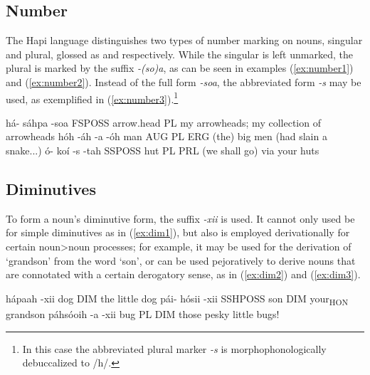 \documentclass[a4paper, 12pt, oneside]{memoir}
\newcommand{\emh}[1]{\textit{#1}}
\begin{document}
\subsection{Number}\label{snumber}
The Hapi language distinguishes two types of number marking on nouns, singular and plural, glossed as {\Sg} and {\Pl} respectively. While the singular is left unmarked, the plural is marked by the suffix \emh{-(so)a}, as can be seen in examples (\ref{ex:number1}) and (\ref{ex:number2}). Instead of the full form \emh{-soa}, the abbreviated form \emh{-s} may be used, as exemplified in (\ref{ex:number3}).\footnote{In this case the abbreviated plural marker \emh{-s} is morphophonologically debuccalized to /h/.}
\begin{examples}
\ex
\label{ex:number1}
\bits há- sáhpa -soa
\gloss FSPOSS arrow.head PL
\tr my arrowheads; my collection of arrowheads
\ex
\label{ex:number2}
\bits hóh -áh -a -óh
\gloss man AUG PL ERG
\tr (the) big men (had slain a snake...)
\ex 
\label{ex:number3}
\bits ó- koí -s -tah
\gloss SSPOSS hut PL PRL
\tr (we shall go) via your huts
\end{examples}
\subsection{Diminutives}\label{sdim}
To form a noun's diminutive form, the suffix \emh{-xii} is used. It cannot only used be for simple diminutives as in (\ref{ex:dim1}), but also is employed derivationally for certain noun>noun processes; for example, it may be used for the derivation of `grandson' from the word `son', or can be used pejoratively to derive nouns that are connotated with a certain derogatory sense, as in (\ref{ex:dim2}) and (\ref{ex:dim3}).
\begin{examples}
\ex
\label{ex:dim1}
\bits hápaah -xii 
\gloss dog DIM
\tr the little dog
\ex
\label{ex:dim2}
\bits pái- hósii -xii
\gloss SSHPOSS son DIM
\tr your\textsubscript{HON} grandson
\ex
\label{ex:dim3}
\bits páhsóoih -a -xii
\gloss bug PL DIM
\tr those pesky little bugs!
\end{examples}
\end{document}
